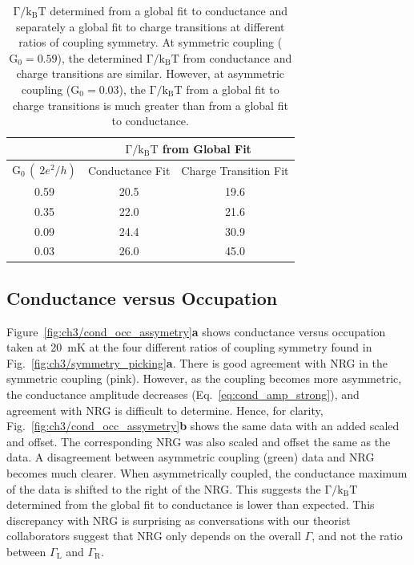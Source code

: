 \begin{table}[!hbt] 
\centering
\begin{tabular}{|c|c|c|}
\hline
\multicolumn{1}{|c|}{} & \multicolumn{2}{c|}{$\mathrm{\Gamma/k_BT}$ from Global Fit}\\
\hline
 $\mathrm{G_0}\,(\qty{}{2e^2/h})$ & Conductance Fit & Charge Transition Fit \\
\hline
0.59 & 20.5 & 19.6 \\
0.35 & 22.0 & 21.6 \\
0.09 & 24.4 & 30.9\\
0.03 & 26.0 & 45.0\\
\hline
\end{tabular}
 \caption[$\mathrm{\Gamma/k_BT}$ From Conductance and Charge Transition Global Fits]{\label{tab:sym_coupling_gf} $\mathrm{\Gamma/k_BT}$ determined from a global fit to conductance and separately a global fit to charge transitions at different ratios of coupling symmetry. At symmetric coupling ($\mathrm{G_0}=0.59$), the determined $\mathrm{\Gamma/k_BT}$ from conductance and charge transitions are similar. However, at asymmetric coupling ($\mathrm{G_0}=0.03$), the $\mathrm{\Gamma/k_BT}$ from a global fit to charge transitions is much greater than from a global fit to conductance.}
\end{table}


\subsection{Conductance versus Occupation}




Figure~\ref{fig:ch3/cond_occ_assymetry}\textbf{a} shows conductance versus occupation taken at \qty{20}{mK} at the four different ratios of coupling symmetry found in Fig.~\ref{fig:ch3/symmetry_picking}\textbf{a}. There is good agreement with NRG in the symmetric coupling (pink). However, as the coupling becomes more asymmetric, the conductance amplitude decreases (Eq.~\ref{eq:cond_amp_strong}), and agreement with NRG is difficult to determine. Hence, for clarity, Fig.~\ref{fig:ch3/cond_occ_assymetry}\textbf{b} shows the same data with an added scaled and offset. The corresponding NRG was also scaled and offset the same as the data. A disagreement between asymmetric coupling (green) data and NRG becomes much clearer. When asymmetrically coupled, the conductance maximum of the data is shifted to the right of the NRG. This suggests the $\mathrm{\Gamma/k_BT}$ determined from the global fit to conductance is lower than expected. This discrepancy with NRG is surprising as conversations with our theorist collaborators suggest that NRG only depends on the overall $\Gamma$, and not the ratio between $\Gamma_\mathrm{L}$ and $\Gamma_\mathrm{R}$.


